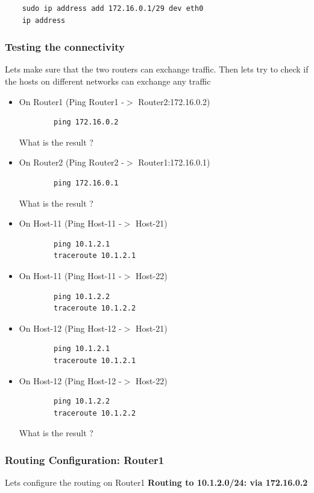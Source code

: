 \begin{verbatim}
    sudo ip address add 172.16.0.1/29 dev eth0
    ip address
\end{verbatim}

\subsubsection{Testing the connectivity}
Lets make sure that the two routers can exchange traffic. Then lets try to check if the hosts on different networks can exchange any traffic
\newline
\begin{itemize}
	\item On Router1 (Ping Router1 -$>$ Router2:172.16.0.2)
	\begin{verbatim}
	    ping 172.16.0.2
	\end{verbatim}

	What is the result ?
	\item On Router2 (Ping Router2 -$>$ Router1:172.16.0.1)
	\begin{verbatim}
	    ping 172.16.0.1
	\end{verbatim}

	What is the result ?
	\item On Host-11 (Ping Host-11 -$>$ Host-21)
	\begin{verbatim}
	    ping 10.1.2.1
	    traceroute 10.1.2.1
	\end{verbatim}

	\item On Host-11 (Ping Host-11 -$>$ Host-22)
	\begin{verbatim}
	    ping 10.1.2.2
	    traceroute 10.1.2.2
	\end{verbatim}

	\item On Host-12 (Ping Host-12 -$>$ Host-21)
	\begin{verbatim}
	    ping 10.1.2.1
	    traceroute 10.1.2.1
	\end{verbatim}

	\item On Host-12 (Ping Host-12 -$>$ Host-22)
	\begin{verbatim}
	    ping 10.1.2.2
	    traceroute 10.1.2.2
	\end{verbatim}

	What is the result ?
\end{itemize}


\subsubsection{Routing Configuration: Router1}
Lets configure the routing on Router1
\textbf{Routing to 10.1.2.0/24: via 172.16.0.2}

